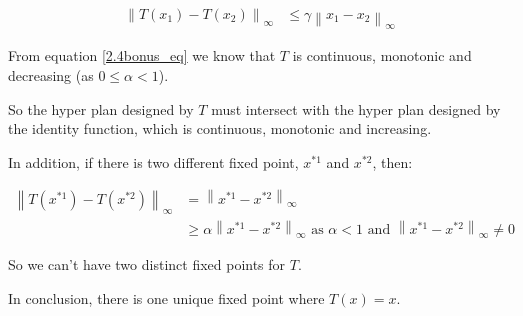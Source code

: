 


\begin{align}
    \left\| T(x_1) - T(x_2) \right\|_{\infty} &\leq \gamma \left\| x_1 - x_2 \right\|_{\infty} \label{2.4bonus_eq}
\end{align}


From equation \ref{2.4bonus_eq} we know that $T$ is continuous, monotonic and decreasing (as $0 \leq \alpha < 1$).

So the hyper plan designed by $T$ must intersect with the hyper plan designed by the identity function, which is continuous, monotonic and increasing.

In addition, if there is two different fixed point, $x^{*1}$ and $x^{*2}$, then:

\begin{align*}
    \left\| T(x^{*1}) - T(x^{*2}) \right\|_\infty
    &= \left\| x^{*1} - x^{*2} \right\|_\infty \\
    &\geqslant \alpha \left\| x^{*1} - x^{*2} \right\|_\infty \text{ as } \alpha < 1 \text{ and } \left\| x^{*1} - x^{*2} \right\|_\infty \neq 0
\end{align*}

So we can't have two distinct fixed points for $T$.

In conclusion, there is one unique fixed point where $T(x) = x$.
